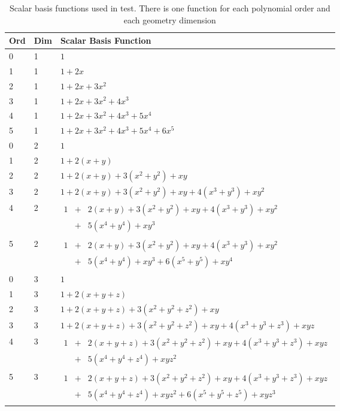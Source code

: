 \begin{table} [H]
\centering
\begin{tabular}{ | l | l | l |}
  \hline
  Ord & Dim & Scalar Basis Function \\ \hline
  0 & 1 & $1$ \\ \hline
  1 & 1 & $1 + 2x$ \\ \hline
  2 & 1 & $1 + 2x + 3x^2$ \\ \hline
  3 & 1 & $1 + 2x + 3x^2 + 4x^3$ \\ \hline
  4 & 1 & $1 + 2x + 3x^2 + 4x^3 + 5x^4$ \\ \hline
  5 & 1 & $1 + 2x + 3x^2 + 4x^3 + 5x^4 + 6x^5$ \\ \hline
  0 & 2 & $1$ \\ \hline
  1 & 2 & $1 + 2(x + y)$ \\ \hline
  2 & 2 & $1 + 2(x + y) + 3(x^2 + y^2) + xy$ \\ \hline
  3 & 2 & $1 + 2(x + y) + 3(x^2 + y^2) + xy + 4(x^3 + y^3) + xy^2$ \\ \hline
  4 & 2 & $\begin{array}{lcl} 1 & + & 2(x + y) + 3(x^2 + y^2) + xy + 4(x^3 + y^3) + xy^2 \\ & + & 5(x^4 + y^4) + xy^3 \end{array}$ \\ \hline
  5 & 2 & $\begin{array}{lcl} 1 & + & 2(x + y) + 3(x^2 + y^2) + xy + 4(x^3 + y^3) + xy^2 \\ & + & 5(x^4 + y^4) + xy^3 + 6(x^5 + y^5) + xy^4 \end{array}$ \\ \hline
  0 & 3 & $1$ \\ \hline
  1 & 3 & $1 + 2(x + y + z)$ \\ \hline
  2 & 3 & $1 + 2(x + y + z) + 3(x^2 + y^2 + z^2) + xy$ \\ \hline
  3 & 3 & $1 + 2(x + y + z) + 3(x^2 + y^2 + z^2) + xy + 4(x^3 + y^3 + z^3) + xyz$ \\ \hline
  4 & 3 & $\begin{array}{lcl} 1 & + & 2(x + y + z) + 3(x^2 + y^2 + z^2) + xy + 4(x^3 + y^3 + z^3) + xyz \\ & + & 5(x^4 + y^4 + z^4) + xyz^2 \end{array}$ \\ \hline
  5 & 3 & $\begin{array}{lcl} 1 & + & 2(x + y + z) + 3(x^2 + y^2 + z^2) + xy + 4(x^3 + y^3 + z^3) + xyz \\ & + & 5(x^4 + y^4 + z^4) + xyz^2 + 6(x^5 + y^5 + z^5) + xyz^3 \end{array}$ \\ \hline
\end{tabular}
\caption{Scalar basis functions used in \curvgeom{} test. There is one function for each polynomial order and each geometry dimension}
\label{appendix:tests:curvgeom:integrand}
\end{table}

